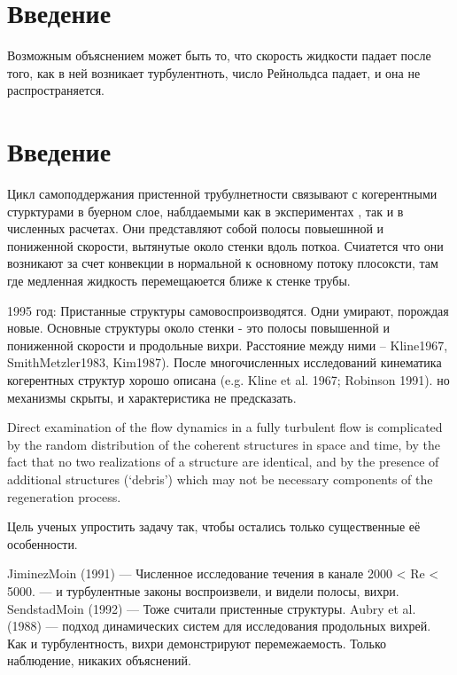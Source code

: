 \chapter{Введение}








Возможным объяснением может быть то, что скорость жидкости падает после того, как в ней возникает турбулентноть, число Рейнольдса падает, и она не распространяется. 

\chapter{Введение}


Цикл самоподдержания пристенной трубулнетности связывают с когерентными стурктурами в буерном слое, наблдаемыми как в экспериментах \cite{kline1967structure}, так и в численных расчетах. Они представляют собой полосы повыешнной и пониженной скорости, вытянутые около стенки вдоль поткоа. Счиатется что они возникают за счет конвекции в нормальной к основному потоку плосоксти, там где медленная жидкость перемещаюется ближе к стенке трубы. 


1995 год: Пристанные структуры самовоспроизводятся. Одни умирают, порождая новые. Основные структуры около стенки - это полосы повышенной и пониженной скорости и продольные вихри. Расстояние между ними -- Kline1967, SmithMetzler1983, Kim1987). После многочисленных исследований кинематика когерентных структур хорошо описана (e.g. Kline et al. 1967; Robinson 1991). но механизмы скрыты, и характеристика не предсказать. 

Direct examination of the flow dynamics in a fully turbulent flow is complicated by the random distribution of the coherent structures in space and time, by the fact that no two realizations of a structure are identical, and by the presence of additional structures (‘debris’) which may not be necessary components of the regeneration process.

Цель ученых упростить задачу так, чтобы остались только существенные её особенности. 

JiminezMoin (1991) --- Численное исследование течения в канале 2000 < Re < 5000. --- и турбулентные законы воспроизвели, и видели полосы, вихри. 
SendstadMoin (1992) --- Тоже считали пристенные структуры. 
Aubry et al. (1988) --- подход динамических систем для исследования продольных вихрей. Как и турбулентность, вихри демонстрируют перемежаемость. Только наблюдение, никаких объяснений. 


